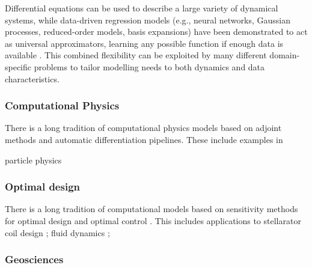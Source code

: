 Differential equations can be used to describe a large variety of dynamical systems, while data-driven regression models (e.g., neural networks, Gaussian processes, reduced-order models, basis expansions) have been demonstrated to act as universal approximators, learning any possible function if enough data is available \cite{gorban_1998}. 
This combined flexibility can be exploited by many different domain-specific problems to tailor modelling needs to both dynamics and data characteristics.



\subsubsection{Computational Physics}

There is a long tradition of computational physics models based on adjoint methods and automatic differentiation pipelines. 
These include examples in 

particle physics \cite{Dorigo.2022}

\subsubsection{Optimal design}

There is a long tradition of computational models based on sensitivity methods for optimal design and optimal control \cite{lions1971optimal, pironneau2005optimal, allaire2014shape}.
This includes applications to 
stellarator coil design \cite{McGreivy_stellarator_2021}; 
fluid dynamics \cite{Giles_Pierce_2000, mohammadi2009applied};



\subsubsection{Geosciences}


